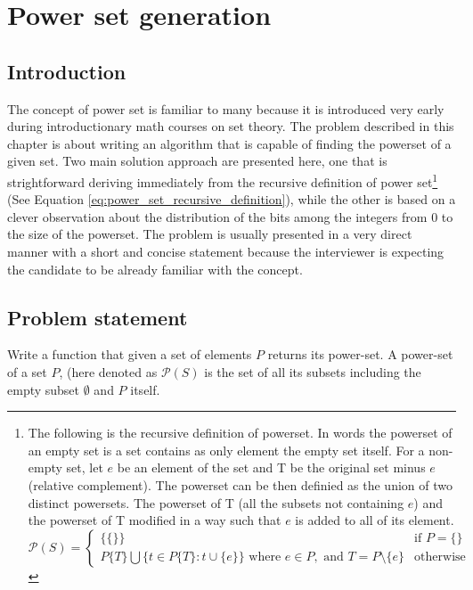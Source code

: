 %


\chapter{Power set generation}
\label{ch:power_set}
\section*{Introduction}
The concept of power set is familiar to many because it is introduced very early during
introductionary math courses on set theory. The problem described in this chapter is about writing
an algorithm that is capable of finding the powerset of a given set. Two main solution approach are
presented here, one that is strightforward deriving immediately from the recursive definition of
power set\footnote{The following is the recursive definition of powerset. In words the powerset of an empty
set is a set contains as only element the empty set itself. For a non-empty set, let $e$ be an
element of the set and T be the original set minus $e$ (relative complement). The powerset can
be then definied as the union of two distinct powersets. The powerset of T (all the subsets not
containing $e$) and the powerset of T modified in a way such that $e$ is added to all of its
element.
\begin{equation}
	\mathcal{P}(S)=\begin{cases} 
\{\{\}\} & \text{if } P=\{\} \\
P\{T\} \bigcup \{t \in P\{T\} : t \cup \{e\}\} \text{ where } e \in P, \text{ and } T = P \setminus \{e\} & \text{otherwise}
\end{cases}
\label{eq:power_set_recursive_definition}
\end{equation} 
} (See Equation \ref{eq:power_set_recursive_definition}), while the other is based on a clever
observation about the distribution of the bits among the integers from $0$ to the size of the
powerset. The problem is usually presented in a very direct manner with a short and concise
statement because the interviewer is expecting the candidate to be already familiar with the
concept.



\section{Problem statement}
Write a function that given a set of elements $P$ returns its power-set. A power-set of a set $P$,
(here denoted as $\mathcal{P}(S)$ is the set of all its subsets including the empty subset
$\emptyset$ and $P$ itself.

